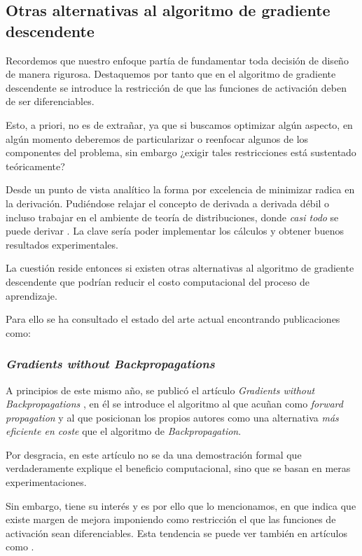 
\subsection{Otras alternativas al algoritmo de gradiente descendente}  

Recordemos que nuestro enfoque partía de
fundamentar toda decisión de diseño de manera rigurosa. Destaquemos por tanto que en el algoritmo de gradiente descendente se introduce la restricción de que 
las funciones de activación deben de ser diferenciables.

Esto, a priori, no es de extrañar, ya que si buscamos optimizar algún aspecto, en algún momento deberemos de particularizar o reenfocar algunos de los componentes del problema, sin embargo ¿exigir tales restricciones está sustentado teóricamente? 

Desde un punto de vista analítico la forma por excelencia de minimizar radica en la derivación. Pudiéndose relajar el concepto de derivada a derivada 
débil o incluso trabajar en el ambiente de teoría de distribuciones, donde \textit{casi todo} se puede 
derivar \cite{teoriaDistribuciones}.
 La clave sería poder implementar los cálculos y obtener buenos resultados experimentales.

La cuestión reside entonces si existen otras alternativas al algoritmo de gradiente descendente 
que podrían reducir el costo computacional del proceso de aprendizaje. 

Para ello se ha consultado el estado del arte actual encontrando publicaciones como: 

\subsubsection{\textit{Gradients without Backpropagations}}

A principios de este mismo año, se publicó el artículo \textit{Gradients without Backpropagations} \cite{forwardGradient}, en él se introduce el algoritmo al que acuñan como 
\textit{forward propagation} y al que posicionan los propios autores como una alternativa \textit{más eficiente en coste} que el algoritmo de \textit{Backpropagation}. 

Por desgracia, en este artículo no se da una demostración formal que verdaderamente explique el beneficio computacional, sino que se basan en meras experimentaciones. 

Sin embargo, tiene su interés y es por ello que lo mencionamos, en que indica que existe margen de mejora 
imponiendo como restricción el que las funciones de activación sean diferenciables. 
Esta tendencia se puede ver también en artículos como \cite{TransactionsOnNeuralNetworks}.



